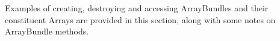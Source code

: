 
Examples of creating, destroying and accessing ArrayBundles and their
constituent Arrays are provided in this section, along with some
notes on ArrayBundle methods.
